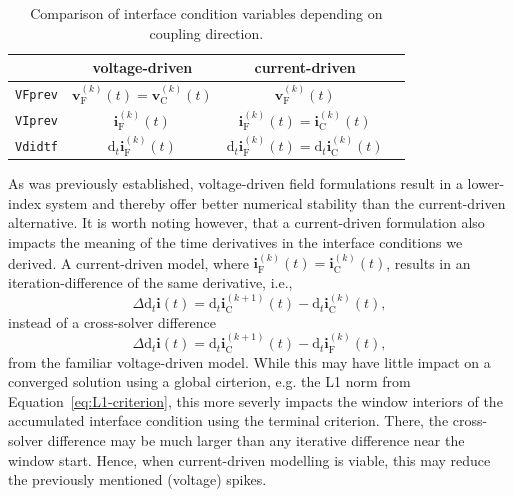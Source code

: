 \begin{table}[htb]
  \centering
  \caption{Comparison of interface condition variables depending on coupling direction.}
  \label{tab:coupling-dir-comparison}
  \begin{tabular}{lccc}
    \toprule
     & voltage-driven & current-driven \\
    \midrule
    \lstinline|VFprev|      & $\mathbf{v}_{\text{F}}^{(k)}(t) = \mathbf{v}_{\text{C}}^{(k)}(t)$ & $\mathbf{v}_{\text{F}}^{(k)}(t)$   \\
    \lstinline|VIprev|      & $\mathbf{i}_{\text{F}}^{(k)}(t)$ & $\mathbf{i}_{\text{F}}^{(k)}(t) = \mathbf{i}_{\text{C}}^{(k)}(t)$   \\
    \lstinline|Vdidtf|      & $\textrm{d}_{t}\mathbf{i}_{\text{F}}^{(k)}(t)$ & $\textrm{d}_{t}\mathbf{i}_{\text{F}}^{(k)}(t) = \textrm{d}_{t}\mathbf{i}_{\text{C}}^{(k)}(t)$ \\
    \bottomrule
  \end{tabular}
  \par\smallskip
\end{table}

As was previously established, voltage-driven field formulations result in a lower-index system and thereby offer better numerical stability than the current-driven alternative. It is worth noting however, that a current-driven formulation also impacts the meaning of the time derivatives in the interface conditions we derived. A current-driven model, where $\mathbf{i}_{\text{F}}^{(k)}(t) = \mathbf{i}_{\text{C}}^{(k)}(t)$, results in an iteration-difference of the same derivative, i.e.,
\begin{equation*}
    \Delta \mathrm{d}_t \mathbf{i}(t) = \mathrm{d}_t \mathbf{i}_{\text{C}}^{(k+1)}(t) - \mathrm{d}_t  \mathbf{i}_{\text{C}}^{(k)}(t),
\end{equation*}
instead of a cross-solver difference
\begin{equation*}
    \Delta \mathrm{d}_t \mathbf{i}(t) = \mathrm{d}_t \mathbf{i}_{\text{C}}^{(k+1)}(t) - \mathrm{d}_t  \mathbf{i}_{\text{F}}^{(k)}(t),
\end{equation*}
from the familiar voltage-driven model. While this may have little impact on a converged solution using a global cirterion, e.g. the L1 norm from Equation~\eqref{eq:L1-criterion}, this more severly impacts the window interiors of the accumulated interface condition using the terminal criterion. There, the cross-solver difference may be much larger than any iterative difference near the window start. Hence, when current-driven modelling is viable, this may reduce the previously mentioned (voltage) spikes.

